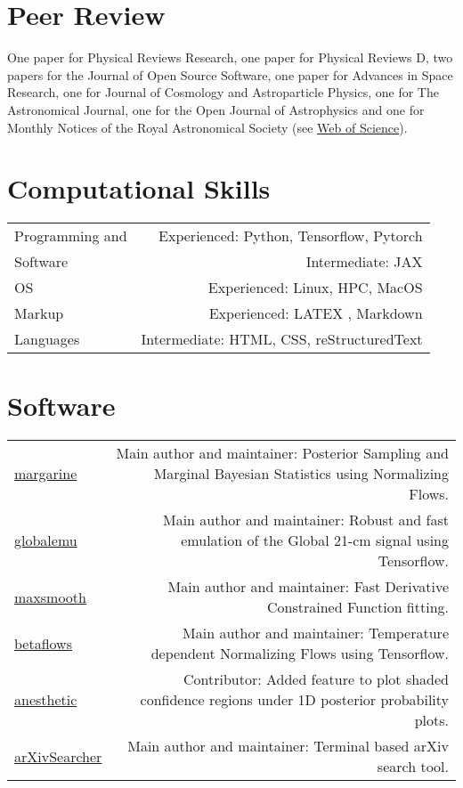 \documentclass{article}
\begin{document}
\section*{Peer Review}
\noindent One paper for Physical Reviews Research, one paper for Physical Reviews D, two papers for the Journal of Open Source Software, one paper for Advances in Space Research, one for Journal of Cosmology and Astroparticle Physics, one for The Astronomical Journal, one for the Open Journal of Astrophysics and one for Monthly Notices of the Royal Astronomical Society (see \href{https://www.webofscience.com/wos/author/record/3920858}{Web of Science}).

\section*{Computational Skills}

\begin{tabular}{L!{\vrule}R}
	Programming and & Experienced: Python, Tensorflow, Pytorch \\
    Software & Intermediate: JAX \\
    OS & Experienced: Linux, HPC, MacOS \\
	Markup & Experienced: LATEX , Markdown\\
	Languages & Intermediate: HTML, CSS, reStructuredText
\end{tabular}

\section*{Software}

\begin{tabular}{L!{\vrule}R}
	\href{https://github.com/htjb/margarine}{margarine} & Main author and maintainer: Posterior Sampling and Marginal Bayesian Statistics using Normalizing Flows. \\
	\href{https://github.com/htjb/globalemu}{globalemu} & Main author and maintainer: Robust and fast emulation of the Global 21-cm signal using Tensorflow. \\
	\href{https://github.com/htjb/maxsmooth}{maxsmooth} & Main author and maintainer: Fast Derivative Constrained Function fitting.\\
     \href{https://github.com/htjb/beta-flows}{betaflows} & Main author and maintainer: Temperature dependent Normalizing Flows using Tensorflow. \\
	\href{https://github.com/williamjameshandley/anesthetic}{anesthetic} & Contributor: Added feature to plot shaded confidence regions under 1D posterior probability plots.\\
	\href{https://github.com/htjb/arXivSearcher}{arXivSearcher} & Main author and maintainer: Terminal based arXiv search tool.
\end{tabular}
\end{document}
